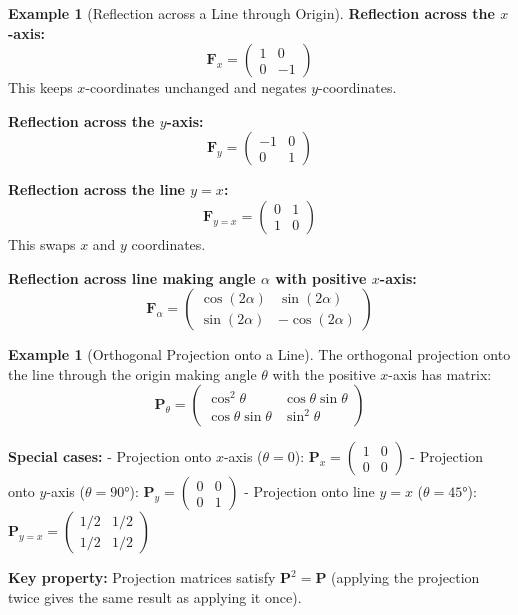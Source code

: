 \documentclass[12pt]{article}
\numberwithin{equation}{section}
\newcommand{\mat}[1]{\mathbf{#1}}        %
\theoremstyle{plain}
\theoremstyle{definition}
\newtheorem{example}[theorem]{Example}
\theoremstyle{remark}
\begin{document}
\begin{example}[Reflection across a Line through Origin]
\textbf{Reflection across the $x$-axis:}
$$\mat{F}_x = \begin{pmatrix} 1 & 0 \\ 0 & -1 \end{pmatrix}$$
This keeps $x$-coordinates unchanged and negates $y$-coordinates.

\textbf{Reflection across the $y$-axis:}
$$\mat{F}_y = \begin{pmatrix} -1 & 0 \\ 0 & 1 \end{pmatrix}$$

\textbf{Reflection across the line $y = x$:}
$$\mat{F}_{y=x} = \begin{pmatrix} 0 & 1 \\ 1 & 0 \end{pmatrix}$$
This swaps $x$ and $y$ coordinates.

\textbf{Reflection across line making angle $\alpha$ with positive $x$-axis:}
$$\mat{F}_\alpha = \begin{pmatrix} \cos(2\alpha) & \sin(2\alpha) \\ \sin(2\alpha) & -\cos(2\alpha) \end{pmatrix}$$
\end{example}

\begin{example}[Orthogonal Projection onto a Line]
The orthogonal projection onto the line through the origin making angle $\theta$ with the positive $x$-axis has matrix:
$$\mat{P}_\theta = \begin{pmatrix} \cos^2\theta & \cos\theta\sin\theta \\ \cos\theta\sin\theta & \sin^2\theta \end{pmatrix}$$

\textbf{Special cases:}
- Projection onto $x$-axis ($\theta = 0$): $\mat{P}_x = \begin{pmatrix} 1 & 0 \\ 0 & 0 \end{pmatrix}$
- Projection onto $y$-axis ($\theta = 90°$): $\mat{P}_y = \begin{pmatrix} 0 & 0 \\ 0 & 1 \end{pmatrix}$
- Projection onto line $y = x$ ($\theta = 45°$): $\mat{P}_{y=x} = \begin{pmatrix} 1/2 & 1/2 \\ 1/2 & 1/2 \end{pmatrix}$

\textbf{Key property:} Projection matrices satisfy $\mat{P}^2 = \mat{P}$ (applying the projection twice gives the same result as applying it once).
\end{example}
\end{document}

